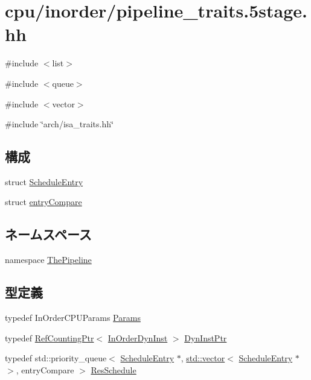 \hypertarget{pipeline__traits_85stage_8hh}{
\section{cpu/inorder/pipeline\_\-traits.5stage.hh}
\label{pipeline__traits_85stage_8hh}
}
{\ttfamily \#include $<$list$>$}\par
{\ttfamily \#include $<$queue$>$}\par
{\ttfamily \#include $<$vector$>$}\par
{\ttfamily \#include \char`\"{}arch/isa\_\-traits.hh\char`\"{}}\par
\subsection*{構成}
\begin{DoxyCompactItemize}
\item 
struct \hyperlink{structThePipeline_1_1ScheduleEntry}{ScheduleEntry}
\item 
struct \hyperlink{structThePipeline_1_1entryCompare}{entryCompare}
\end{DoxyCompactItemize}
\subsection*{ネームスペース}
\begin{DoxyCompactItemize}
\item 
namespace \hyperlink{namespaceThePipeline}{ThePipeline}
\end{DoxyCompactItemize}
\subsection*{型定義}
\begin{DoxyCompactItemize}
\item 
typedef InOrderCPUParams \hyperlink{namespaceThePipeline_ab62ca16eeca26566ad2422b5df4943ce}{Params}
\item 
typedef \hyperlink{classRefCountingPtr}{RefCountingPtr}$<$ \hyperlink{classInOrderDynInst}{InOrderDynInst} $>$ \hyperlink{namespaceThePipeline_a992959fefcd659c6ba422aa4de14677c}{DynInstPtr}
\item 
typedef std::priority\_\-queue$<$ \hyperlink{classScheduleEntry}{ScheduleEntry} $\ast$, \hyperlink{classstd_1_1vector}{std::vector}$<$ \hyperlink{classScheduleEntry}{ScheduleEntry} $\ast$ $>$, entryCompare $>$ \hyperlink{namespaceThePipeline_a5b095dc783c5dc7d8c0c1fd4c7c2404c}{ResSchedule}
\end{DoxyCompactItemize}
